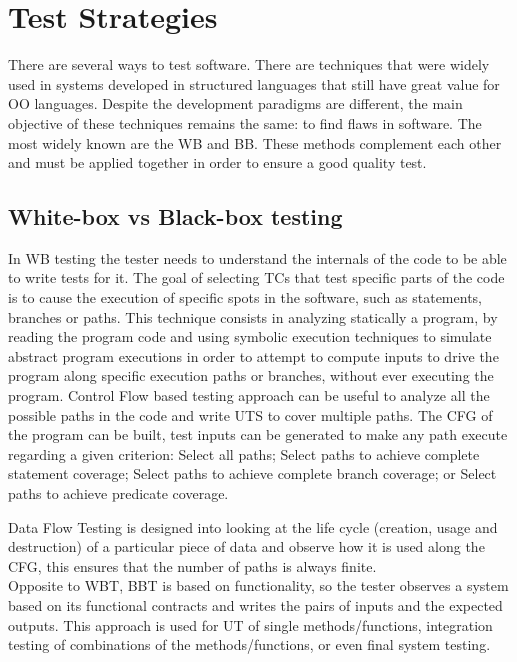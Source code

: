 \section{Test Strategies}
There are several ways to test software. There are techniques that were widely used in systems developed in structured languages
that still have great value for \ac{OO} languages. Despite the
development paradigms are different,
the main objective of these techniques remains the same: to find flaws in software\cite{Myers:2004:AST:983238}.
The most widely known are the \ac{WB} and \ac{BB}.
These methods complement each other and must be applied together in order to ensure a good quality test.
\subsection{White-box vs Black-box testing}
In \ac{WB} testing the tester needs to understand the internals of
the code to be able to write tests for it.
The goal of selecting \ac{TC}s that test specific parts of the code
is to cause the execution of specific spots in the software, such as
statements, branches or paths.
This technique consists in analyzing statically a program, by reading
the program code and using symbolic execution techniques to simulate
abstract program
executions in order to attempt to compute inputs to drive the program
along specific execution paths or branches, without ever executing the
program. Control Flow based testing approach can be useful to analyze all the
possible paths in the code and write \ac{UTS} to cover multiple paths.
The \ac{CFG} of the program can be built,
test inputs can be generated to make any path execute regarding a given criterion:
Select all paths;
Select paths to achieve complete statement
coverage\cite{stt,Ntafos:1988:CST:630792.631017};
Select paths to achieve complete branch coverage\cite{Roper1994,stt};
or Select paths to achieve predicate
coverage\cite{stt,Ntafos:1988:CST:630792.631017}.

Data Flow Testing is designed into looking at the life cycle
(creation, usage and destruction) of a particular
piece of data and observe how it is used along the \ac{CFG}, this ensures
that the number of paths is always finite\cite{dataflow}.\\

Opposite to \ac{WBT}, \ac{BBT} is based on
functionality, so the tester observes a system based
on its functional contracts and writes the pairs of inputs and the
expected outputs.
This approach is used for \ac{UT} of single methods/functions,
integration testing
of combinations of the methods/functions, or even final system testing.\\

